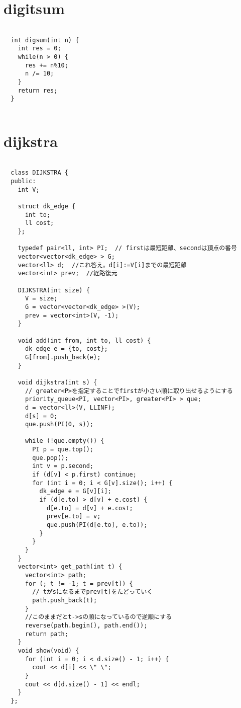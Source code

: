 \documentclass{jsarticle}
\begin{document}
\color{white}
\section{digitsum}
\color{black}
\begin{lstlisting}[caption=digitsum]

  int digsum(int n) {
    int res = 0;
    while(n > 0) {
      res += n%10;
      n /= 10;
    }
    return res;
  }
  

\end{lstlisting}

\color{white}
\section{dijkstra}
\color{black}
\begin{lstlisting}[caption=dijkstra]

  class DIJKSTRA {
  public:
    int V;
  
    struct dk_edge {
      int to;
      ll cost;
    };
  
    typedef pair<ll, int> PI;  // firstは最短距離、secondは頂点の番号
    vector<vector<dk_edge> > G;
    vector<ll> d;  //これ答え。d[i]:=V[i]までの最短距離
    vector<int> prev;  //経路復元
  
    DIJKSTRA(int size) {
      V = size;
      G = vector<vector<dk_edge> >(V);
      prev = vector<int>(V, -1);
    }
  
    void add(int from, int to, ll cost) {
      dk_edge e = {to, cost};
      G[from].push_back(e);
    }
  
    void dijkstra(int s) {
      // greater<P>を指定することでfirstが小さい順に取り出せるようにする
      priority_queue<PI, vector<PI>, greater<PI> > que;
      d = vector<ll>(V, LLINF);
      d[s] = 0;
      que.push(PI(0, s));
  
      while (!que.empty()) {
        PI p = que.top();
        que.pop();
        int v = p.second;
        if (d[v] < p.first) continue;
        for (int i = 0; i < G[v].size(); i++) {
          dk_edge e = G[v][i];
          if (d[e.to] > d[v] + e.cost) {
            d[e.to] = d[v] + e.cost;
            prev[e.to] = v;
            que.push(PI(d[e.to], e.to));
          }
        }
      }
    }
    vector<int> get_path(int t) {
      vector<int> path;
      for (; t != -1; t = prev[t]) {
        // tがsになるまでprev[t]をたどっていく
        path.push_back(t);
      }
      //このままだとt->sの順になっているので逆順にする
      reverse(path.begin(), path.end());
      return path;
    }
    void show(void) {
      for (int i = 0; i < d.size() - 1; i++) {
        cout << d[i] << \" \";
      }
      cout << d[d.size() - 1] << endl;
    }
  };
  

\end{lstlisting}
\end{document}
